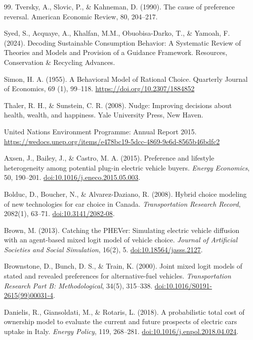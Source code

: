 \documentclass[11pt]{article} %
\begin{document}
\begin{thebibliography}{99.}
Tversky, A., Slovic, P., \& Kahneman, D. (1990). The cause of preference reversal. 
American Economic Review, 80, 204--217.

Syed, S., Acquaye, A., Khalfan, M.M., Obuobisa-Darko, T., \& Yamoah, F. (2024). 
Decoding Sustainable Consumption Behavior: A Systematic Review of Theories and 
Models and Provision of a Guidance Framework. Resources, Conservation \& 
Recycling Advances.

Simon, H. A. (1955). A Behavioral Model of Rational Choice. Quarterly Journal of Economics, 
69 (1), 99--118.  
\url{https://doi.org/10.2307/1884852}

Thaler, R. H., \& Sunstein, C. R. (2008). Nudge: Improving decisions about health, wealth, and happiness.
Yale University Press, New Haven.

United Nations Environment Programme: Annual Report 2015.
\url{https://wedocs.unep.org/items/e478bc19-5dcc-4869-9e6d-8565b46bdfc2}


Axsen, J., Bailey, J., \& Castro, M. A. (2015).
Preference and lifestyle heterogeneity among potential plug-in electric vehicle
buyers.
\emph{Energy Economics}, 50, 190--201.
\href{https://doi.org/10.1016/j.eneco.2015.05.003}{doi:10.1016/j.eneco.2015.05.003}.

Bolduc, D., Boucher, N., \& Alvarez-Daziano, R. (2008).
Hybrid choice modeling of new technologies for car choice in Canada.
\emph{Transportation Research Record}, 2082(1), 63--71.
\href{https://doi.org/10.3141/2082-08}{doi:10.3141/2082-08}.

Brown, M. (2013).
Catching the PHEVer: Simulating electric vehicle diffusion with an
agent-based mixed logit model of vehicle choice.
\emph{Journal of Artificial Societies and Social Simulation}, 16(2), 5.
\href{https://doi.org/10.18564/jasss.2127}{doi:10.18564/jasss.2127}.

Brownstone, D., Bunch, D. S., \& Train, K. (2000).
Joint mixed logit models of stated and revealed preferences for
alternative-fuel vehicles.
\emph{Transportation Research Part B: Methodological}, 34(5), 315--338.
\href{https://doi.org/10.1016/S0191-2615(99)00031-4}{doi:10.1016/S0191-2615(99)00031-4}.

Danielis, R., Giansoldati, M., \& Rotaris, L. (2018).
A probabilistic total cost of ownership model to evaluate the current and future
prospects of electric cars uptake in Italy.
\emph{Energy Policy}, 119, 268--281.
\href{https://doi.org/10.1016/j.enpol.2018.04.024}{doi:10.1016/j.enpol.2018.04.024}.


\end{thebibliography}
\end{document}
